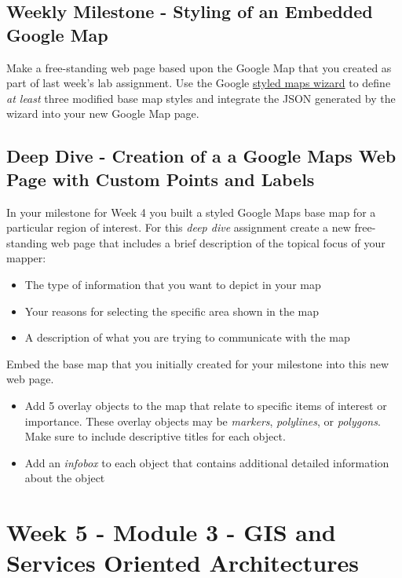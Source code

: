 \documentclass[]{book}
\providecommand{\tightlist}{%
  \setlength{\itemsep}{0pt}\setlength{\parskip}{0pt}}
\begin{document}
\section{Weekly Milestone - Styling of an Embedded Google
Map}\label{week04-milestone}

Make a free-standing web page based upon the Google Map that you created
as part of last week's lab assignment. Use the Google
\href{http://gmaps-samples-v3.googlecode.com/svn/trunk/styledmaps/wizard/index.html}{styled
maps wizard} to define \emph{at least} three modified base map styles
and integrate the JSON generated by the wizard into your new Google Map
page.

\section{Deep Dive - Creation of a a Google Maps Web Page with Custom
Points and Labels}\label{week04-deepDive}

In your milestone for Week 4 you built a styled Google Maps base map for
a particular region of interest. For this \emph{deep dive} assignment
create a new free-standing web page that includes a brief description of
the topical focus of your mapper:

\begin{itemize}
\tightlist
\item
  The type of information that you want to depict in your map
\item
  Your reasons for selecting the specific area shown in the map
\item
  A description of what you are trying to communicate with the map
\end{itemize}

Embed the base map that you initially created for your milestone into
this new web page.

\begin{itemize}
\tightlist
\item
  Add 5 overlay objects to the map that relate to specific items of
  interest or importance. These overlay objects may be \emph{markers},
  \emph{polylines}, or \emph{polygons}. Make sure to include descriptive
  titles for each object.
\item
  Add an \emph{infobox} to each object that contains additional detailed
  information about the object
\end{itemize}

\chapter{Week 5 - Module 3 - GIS and Services Oriented
Architectures}\label{week05}
\end{document}
